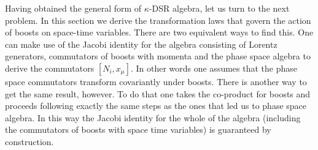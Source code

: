 \documentclass [prd,twocolumn,nofootinbib,showpacs]  {revtex4}
\begin{document}
Having obtained the general form of $\kappa$-DSR algebra, let us
turn to the next problem. In this section  we derive the
transformation laws that govern the action of boosts on space-time
variables. There are two equivalent ways to find this. One can
make use of the Jacobi identity for the algebra consisting of
Lorentz generators, commutators of boosts with momenta and the
phase space algebra to derive the commutators $[N_i, x_\mu]$. In
other words one assumes that the phase space commutators transform
covariantly under boosts. There is another way to get the same
result, however. To do that one takes the co-product for boosts
and proceeds following exactly the same steps as the ones that led
us to phase space algebra. In this way the Jacobi identity for the
whole of the algebra (including the commutators of boosts with
space time variables) is  guaranteed by construction.
\newline
\end{document}
